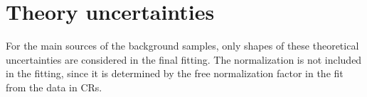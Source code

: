 

\section{Theory uncertainties}
\label{sec:TheoryUnc}
For the main sources of the background samples, only shapes of these theoretical uncertainties are considered in the final fitting. 
The normalization is not included in the fitting, since it is determined by the free normalization factor in the fit from the data in CRs.


